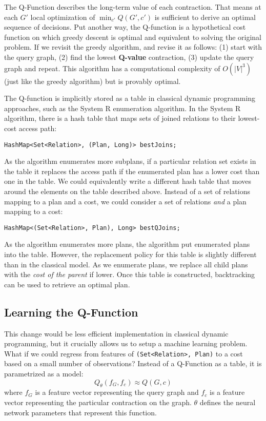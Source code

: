 The Q-Function describes the long-term value of each contraction. 
That means at each $G'$ local optimization of $\min_{c'} Q(G',c')$ is sufficient to derive an optimal sequence of decisions. Put another way, the Q-function is a hypothetical cost function on which greedy descent is optimal and equivalent to solving the original problem.
If we revisit the greedy algorithm, and revise it as follows: (1) start with the query graph, (2) find the lowest \textbf{Q-value} contraction, (3) update the query graph and repeat. This algorithm has a computational complexity of $O(|V|^3)$ (just like the greedy algorithm) but is provably optimal. 

The Q-function is implicitly stored as a table in classical dynamic programming approaches, such as the System R enumeration algorithm. In the System R algorithm, there is a hash table that maps sets of joined relations to their lowest-cost access path:
\begin{lstlisting}
HashMap<Set<Relation>, (Plan, Long)> bestJoins;
\end{lstlisting}
As the algorithm enumerates more subplans, if a particular relation set exists in the table it replaces the access path if the enumerated plan has a lower cost than one in the table. We could equivalently write a different hash table that moves around the elements on the table described above. Instead of a set of relations mapping to a plan and a cost, we could consider a set of relations \emph{and} a plan mapping to a cost: 
\begin{lstlisting}
HashMap<(Set<Relation>, Plan), Long> bestQJoins;
\end{lstlisting}
As the algorithm enumerates more plans, the algorithm put enumerated plans into the table. However, the replacement policy for this table is slightly different than in the classical model. As we enumerate plans, we replace all child plans with the \emph{cost of the parent} if lower. Once this table is constructed, backtracking can be used to retrieve an optimal plan.

\subsection{Learning the Q-Function}
This change would be less efficient implementation in classical dynamic programming, but it crucially allows us to setup a machine learning problem. 
What if we could regress from features of \texttt{(Set<Relation>, Plan)} to a cost based on a small number of observations?
Instead of a Q-Function as a table, it is parametrized as a model:
\[
Q_\theta(f_G,f_c) \approx Q(G,c)
\]
where $f_G$ is a feature vector representing the query graph and $f_c$ is a feature vector representing the particular contraction on the graph. $\theta$ defines the neural network parameters that represent this function. 

